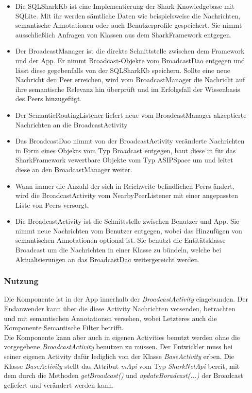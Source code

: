 \begin{itemize}
	\item Die SQLSharkKb ist eine Implementierung der Shark Knowledgebase mit SQLite. Mit ihr werden sämtliche Daten wie beispielsweise die Nachrichten, semantische Annotationen oder auch Benutzerprofile gespeichert. Sie nimmt ausschließlich Anfragen von Klassen aus dem SharkFramework entgegen.
	\item Der BroadcastManager ist die direkte Schnittstelle zwischen dem Framework und der App. Er nimmt Broadcast-Objekte vom BroadcastDao entgegen und lässt diese gegebenfalls von der SQLSharkKb speichern. Sollte eine neue Nachricht den Peer erreichen, wird vom BroadcastManager die Nachricht auf ihre semantische Relevanz hin überprüft und im Erfolgsfall der Wissenbasis des Peers hinzugefügt.
	\item Der SemanticRoutingListener liefert neue vom BroadcastManager akzeptierte Nachrichten an die BroadcastActivity
	\item Das BroadcastDao nimmt von der BroadcastActivity veränderte Nachrichten in Form eines Objekts vom Typ Broadcast entgegen, baut diese in für das SharkFramework vewertbare Objekte vom Typ ASIPSpace um und leitet diese an den BroadcastManager weiter.
	\item Wann immer die Anzahl der sich in Reichweite befindlichen Peers ändert, wird die BroadcastActivity vom NearbyPeerListener mit einer angepassten Liste von Peers versorgt.
	\item Die BroadcastActivity ist die Schnittstelle zwischen Benutzer und App. Sie nimmt neue Nachrichten vom Benutzer entgegen, wobei das Hinzufügen von semantischen Annotationen optional ist. Sie benutzt die Entitätsklasse Broadcast um die Nachrichten in einer Klasse zu bündeln, welche bei Aktualisierungen an das BroadcastDao weitergereicht werden. 
\end{itemize}

\label{ch:broadcastinterfaces}


\subsubsection{Nutzung}
Die Komponente ist in der App innerhalb der \textit{BroadcastActivity} eingebunden. Der Endanwender kann über die diese Activity Nachrichten versenden, betrachten und mit semantischen Annotationen versehen, wobei Letzteres auch die Komponente Semantische Filter betrifft.
\\Die Komponente kann aber auch in eigenen Activities benutzt werden ohne die vorgegebene \textit{BroadcastActivity} benutzen zu müssen. Der Entwickler muss bei seiner eigenen Activity dafür lediglich von der Klasse \textit{BaseActivity} erben. Die Klasse \textit{BaseActivity} stellt das Attribut \textit{mApi} vom Typ \textit{SharkNetApi} bereit, mit dem durch die Methoden \textit{getBroadcast()} und \textit{updateBoradcast(...)} der Broadcast geliefert und verändert werden kann.
\\

